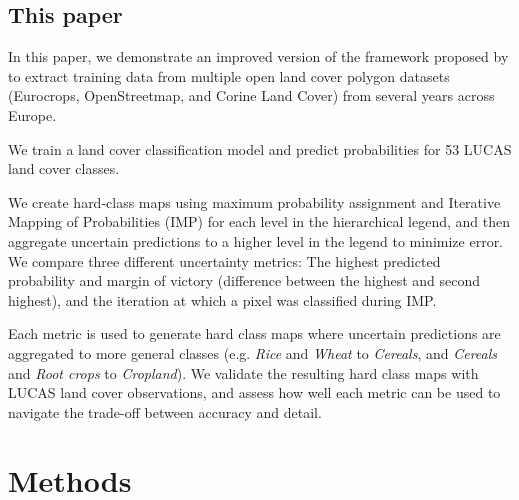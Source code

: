     \subsection{This paper}
        In this paper, we demonstrate an improved version of the framework proposed by \citep{witjes2022spatiotemporal} to extract training data from multiple open land cover polygon datasets (Eurocrops, OpenStreetmap, and Corine Land Cover) from several years across Europe. 
        
        We train a land cover classification model and predict probabilities for 53 LUCAS land cover classes.
        
        We create hard-class maps using maximum probability assignment and Iterative Mapping of Probabilities (IMP) \citep{witjes2024iterative} for each level in the hierarchical legend, and then aggregate uncertain predictions to a higher level in the legend to minimize error. We compare three different uncertainty metrics: The highest predicted probability and margin of victory (difference between the highest and second highest), and the iteration at which a pixel was classified during IMP.
        
        Each metric is used to generate hard class maps where uncertain predictions are aggregated to more general classes (e.g. \textit{Rice} and \textit{Wheat} to \textit{Cereals}, and \textit{Cereals} and \textit{Root crops} to \textit{Cropland}). We validate the resulting hard class maps with LUCAS land cover observations, and assess how well each metric can be used to navigate the trade-off between accuracy and detail.

\section{Methods}

